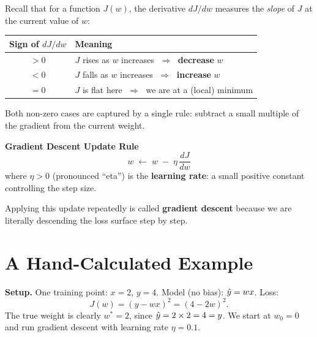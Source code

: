 \documentclass[12pt, a4paper]{article}
\begin{document}
Recall that for a function $J(w)$, the derivative $dJ/dw$ measures the
\emph{slope} of $J$ at the current value of $w$:

\begin{center}
  \renewcommand{\arraystretch}{1.3}
  \begin{tabular}{cl}
    \toprule
    Sign of $dJ/dw$ & Meaning                                                            \\
    \midrule
    $> 0$           & $J$ rises as $w$ increases $\;\Rightarrow\;$ \textbf{decrease} $w$ \\
    $< 0$           & $J$ falls as $w$ increases $\;\Rightarrow\;$ \textbf{increase} $w$ \\
    $= 0$           & $J$ is flat here $\;\Rightarrow\;$ we are at a (local) minimum     \\
    \bottomrule
  \end{tabular}
\end{center}

Both non-zero cases are captured by a single rule: subtract a small multiple
of the gradient from the current weight.

\begin{resultbox}
  \textbf{Gradient Descent Update Rule}
  \[
    w \;\longleftarrow\; w \;-\; \eta\,\frac{dJ}{dw}
  \]
  where $\eta > 0$ (pronounced ``eta'') is the \textbf{learning rate}: a small
  positive constant controlling the step size.
\end{resultbox}

Applying this update repeatedly is called \textbf{gradient descent} because
we are literally descending the loss surface step by step.

\section{A Hand-Calculated Example}

\begin{example}
  \textbf{Setup.}
  One training point: $x = 2$, $y = 4$.
  Model (no bias): $\hat{y} = wx$.
  Loss:
  \[
    J(w) = (y - wx)^2 = (4 - 2w)^2.
  \]
  The true weight is clearly $w^{*} = 2$, since $\hat{y} = 2 \times 2 = 4 = y$.
  We start at $w_0 = 0$ and run gradient descent with learning rate
  $\eta = 0.1$.
\end{example}

\end{document}
